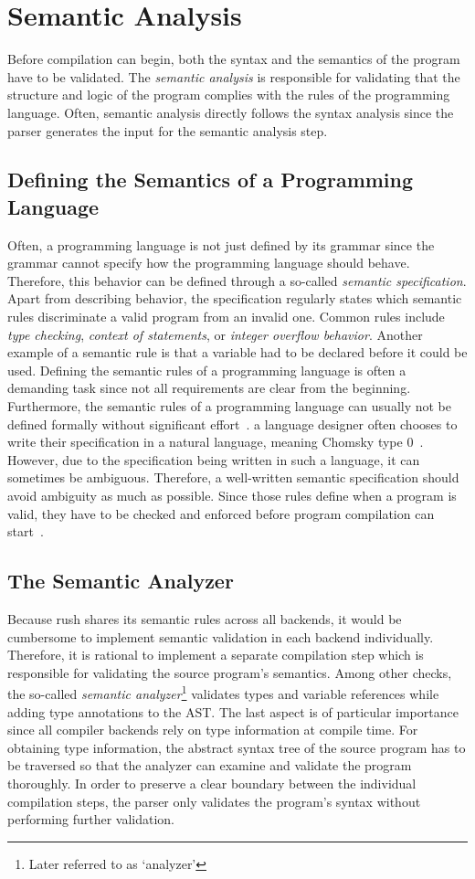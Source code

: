 \section{Semantic Analysis}
Before compilation can begin, both the syntax and the semantics of the program have to be validated.
The \emph{semantic analysis} is responsible for validating that the structure and logic of the program complies with the rules of the programming language.
Often, semantic analysis directly follows the syntax analysis since the parser generates the input for the semantic analysis step.

\subsection{Defining the Semantics of a Programming Language}
Often, a programming language is not just defined by its grammar
since the grammar cannot specify how the programming language should behave.
Therefore, this behavior can be defined through a so-called \emph{semantic specification}.
Apart from describing behavior, the specification regularly states which semantic rules discriminate a valid program from an invalid one.
Common rules include \emph{type checking}, \emph{context of statements}, or \emph{integer overflow behavior}.
Another example of a semantic rule is that a variable had to be declared before it could be used.
Defining the semantic rules of a programming language is often a demanding task
since not all requirements are clear from the beginning.
Furthermore, the semantic rules of a programming language can usually not be defined formally without significant effort~\cite[pp.~5f]{Holm2012}.
a language designer often chooses to write their specification in a natural language, meaning Chomsky type 0~\cite[p.~23]{Watson2017}.
However, due to the specification being written in such a language, it can sometimes be ambiguous.
Therefore, a well-written semantic specification should avoid ambiguity as much as possible.
Since those rules define when a program is valid, they have to be checked and enforced before program compilation can start~\cite[p.~21]{Watson2017}.

\subsection{The Semantic Analyzer}
Because rush shares its semantic rules across all backends,
it would be cumbersome to implement semantic validation in each
backend individually. Therefore, it is rational to implement a separate
compilation step which is responsible for validating the source program's semantics.
Among other checks, the so-called \emph{semantic analyzer}\footnote{Later referred to as `analyzer'} validates types
and variable references while adding type annotations to the AST. The last aspect is
of particular importance since all compiler backends rely on type information at
compile time. For obtaining type information, the abstract syntax
tree of the source program has to be traversed so that the analyzer can examine and validate the program thoroughly.
In order to preserve a clear boundary between the individual compilation steps, the parser
only validates the program's syntax without performing further validation.

